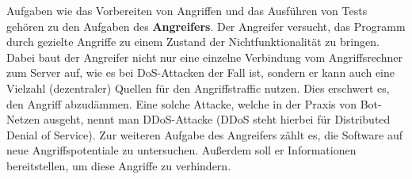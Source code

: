 \documentclass[../review_1.tex]{subfiles}
\begin{document}
Aufgaben wie das Vorbereiten von Angriffen und das Ausführen von Tests gehören zu den Aufgaben des \textbf{Angreifers}. Der Angreifer versucht, das Programm durch gezielte Angriffe zu einem Zustand der Nichtfunktionalität zu bringen. Dabei baut der Angreifer nicht nur eine einzelne Verbindung vom Angriffsrechner zum Server auf, wie es bei DoS-Attacken der Fall ist, sondern er kann auch eine Vielzahl (dezentraler) Quellen für den Angriffstraffic nutzen. Dies erschwert es, den Angriff abzudämmen. Eine solche Attacke, welche in der Praxis von Bot-Netzen ausgeht, nennt man DDoS-Attacke (DDoS steht hierbei für \glqq Distributed Denial of Service\grqq). Zur weiteren Aufgabe des Angreifers zählt es, die Software auf neue Angriffspotentiale zu untersuchen. Außerdem soll er Informationen bereitstellen, um diese Angriffe zu verhindern.
\end{document}
